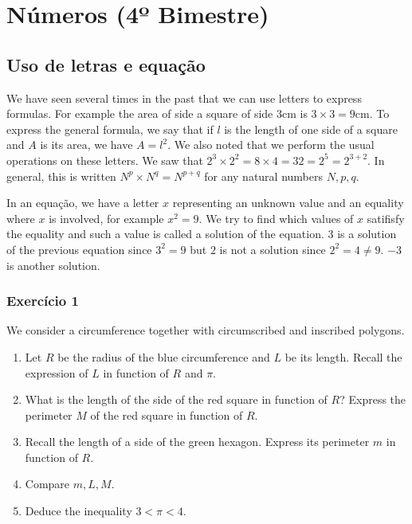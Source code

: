 \chapter{Números (4º Bimestre)}

\section{Uso de letras e equação}

We have seen several times in the past that we can use letters to express
formulas. For example the area of side a square of side $3\text{cm}$ is
$3 \times 3 = 9 \text{cm}$. To express the general formula, we say that if
$l$ is the length of one side of a square and $A$ is its area, we have
$A =  l^2$. We also noted that we perform the usual operations on these letters.
We saw that $2^3 \times 2^2 = 8 \times 4 = 32 = 2^{5} = 2^{3+2}$. In general,
this is written $N^p \times N^q = N^{p+q}$ for any natural numbers $N, p, q$.

In an equação, we have a letter $x$ representing an unknown value and an
equality where $x$ is involved, for example $x^2 = 9$. We try to find which
values of $x$ satifisfy the equality and such a value is called a solution
of the equation. $3$ is a solution of the previous equation since $3^2 = 9$
but $2$ is not a solution since $2^2 = 4 \neq 9$. $-3$ is another solution.

\subsection*{Exercício 1}

We consider a circumference together with circumscribed and inscribed polygons.

\begin{center}
\end{center}

\begin{enumerate}
\item Let $R$ be the radius of the blue circumference and $L$ be its length.
  Recall the expression of $L$ in function of $R$ and $\pi$.
\item What is the length of the side of the red square in function of $R$?
  Express the perimeter $M$ of the red square in function of $R$.
\item Recall the length of a side of the green hexagon.
  Express its perimeter $m$ in function of $R$.
\item Compare $m, L, M$.
\item Deduce the inequality $3 < \pi < 4$.
\end{enumerate}

